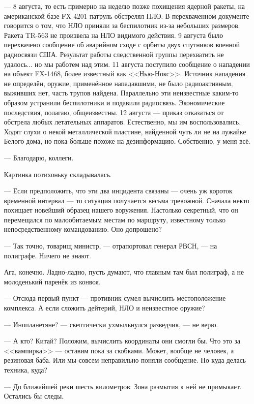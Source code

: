 --- 8 августа, то есть примерно на неделю позже похищения ядерной ракеты, на американской базе FX-4201 патруль обстрелял НЛО.
В перехваченном документе говорится о том, что НЛО приняли за беспилотник из-за небольших размеров.
Ракета TR-563 не произвела на НЛО видимого действия.
9 августа было перехвачено сообщение об аварийном сходе с орбиты двух спутников военной радиосвязи США.
Результат работы следственной группы перехватить не удалось... но мы работем над этим.
11 августа поступило сообщение о нападении на объект FX-1468, более известный как <<Нью-Нокс>>.
Источник нападения не определён, оружие, применённое нападавшими, не было радиоактивным, выживших нет, часть трупов найдена.
Параллельно эти неизвестные каким-то образом устранили беспилотники и подавили радиосвязь.
Экономические последствия, полагаю, общеизвестны.
12 августа --- приказ отказаться от обстрела любых летательных аппаратов. Естественно, мы им воспользовались.
Ходят слухи о некой металлической пластине, найденной чуть ли не на лужайке Белого дома, но пока больше похоже на дезинформацию.
Собственно, у меня всё.


--- Благодарю, коллеги.

Картинка потихоньку складывалась.

--- Если предположить, что эти два инцидента связаны --- очень уж короток временной интервал ---
то ситуация получается весьма тревожной. Сначала некто похищает новейший образец нашего воружения.
Настолько секретный, что он перемещался по малообитаемым местам по маршруту, известному только непосредственному командованию.
Оно допрошено?

--- Так точно, товарищ министр, --- отрапортовал генерал РВСН, --- на полиграфе. Ничего не знают.

Ага, конечно. Ладно-ладно, пусть думают, что главным там был полиграф, а не молоденький паренёк из конвоя.

--- Отсюда первый пункт --- противник сумел вычислить местоположение комплекса.
А если сложить дейтерий, НЛО и неизвестное оружие?

--- Инопланетяне? --- скептически ухмыльнулся разведчик, --- не верю.

--- А кто? Китай? Положим, вычислить координаты они смогли бы. Что это за <<вампирка>> --- оставим пока за скобками.
Может, вообще не человек, а резиновая баба. Или мы совсем неправильно поняли сообщение. Но куда делась техника, куда?

--- До ближайшей реки шесть километров. Зона размытия к ней не примыкает. Остались бы следы.

